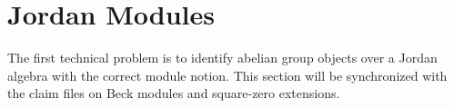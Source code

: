\section{Jordan Modules}

The first technical problem is to identify abelian group objects over a Jordan
algebra with the correct module notion. This section will be synchronized with
the claim files on Beck modules and square-zero extensions.
